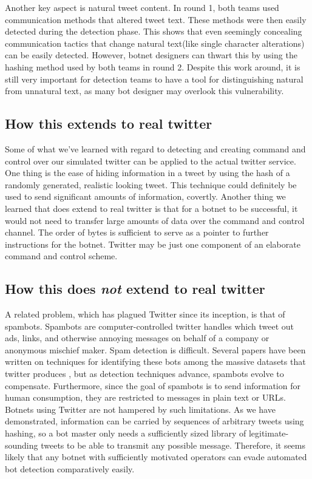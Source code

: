 \documentclass[11pt, oneside]{article} %
\numberwithin{equation}{section} %
\numberwithin{figure}{section} %
\numberwithin{table}{section} %
\begin{document}
		Another key aspect is natural tweet content. In round 1, both teams used communication methods that altered tweet text. These methods were then easily detected during the detection phase. This shows that even seemingly concealing communication tactics that change natural text(like single character alterations) can be easily detected. However, botnet designers can thwart this by using the hashing method used by both teams in round 2. Despite this work around, it is still very important for detection teams to have a tool for distinguishing natural from unnatural text, as many bot designer may overlook this vulnerability.

	\subsection{How this extends to real twitter}
	Some of what we've learned with regard to detecting and creating command and control over our simulated twitter can be applied to the
	actual twitter service. One thing is the ease of hiding information in a tweet by using the hash of a randomly generated, realistic looking tweet.
	This technique could definitely be used to send significant amounts of information, covertly. Another thing we learned that does extend to real
	twitter is that for a botnet to be successful, it would not need to transfer large amounts of data over the command and control channel. The order of
	bytes is sufficient to serve as a pointer to further instructions for the botnet. Twitter may be just one component of an elaborate command and control scheme.

	\subsection{How this does \textit{not} extend to real twitter}
    A related problem, which has plagued Twitter since its inception, is that of spambots. Spambots are computer-controlled twitter handles which tweet out ads, links, and otherwise annoying messages on behalf of a company or anonymous mischief maker. Spam detection is difficult. Several papers have been written on techniques for identifying these bots among the massive datasets that twitter produces \cite{botdetect} \cite{spambotML} \cite{socialnet_spam}, but as detection techniques advance, spambots evolve to compensate. Furthermore, since the goal of spambots is to send information for human consumption, they are restricted to messages in plain text or URLs. Botnets using Twitter are not hampered by such limitations. As we have demonstrated, information can be carried by sequences of arbitrary tweets using hashing, so a bot master only needs a sufficiently sized library of legitimate-sounding tweets to be able to transmit any possible message. Therefore, it seems likely that any botnet with sufficiently motivated operators can evade automated bot detection comparatively easily.
\end{document}
